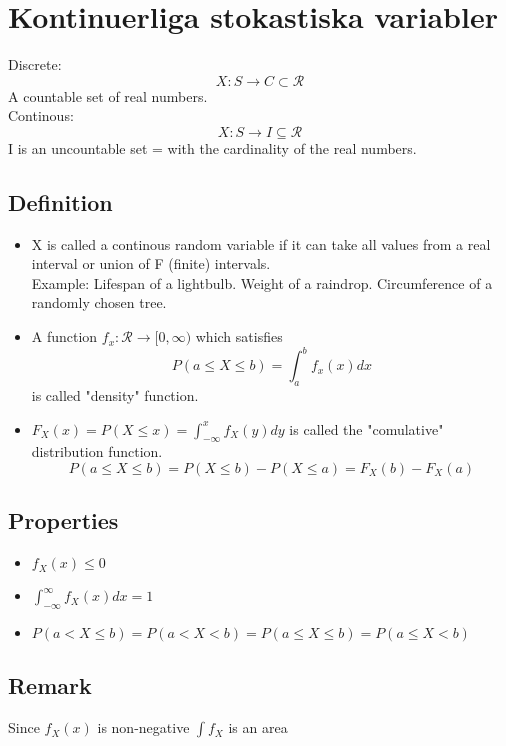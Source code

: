 \documentclass{article}
\newcommand{\RR}{{\mathcal{R}}}
\begin{document}
\section{Kontinuerliga stokastiska variabler}
Discrete:
$$ X:S\rightarrow C\subset \RR $$
A countable set of real numbers.\\
Continous:
$$ X:S\rightarrow I\subseteq \RR $$
I is an uncountable set = with the cardinality of the real numbers.


\subsection{Definition}
\begin{itemize}
    \item X is called a continous random variable if it can take all values from a real interval or union of F (finite) intervals.\\
      Example: Lifespan of a lightbulb. Weight of a raindrop. Circumference of a randomly chosen tree.
    \item A function $f_x:\RR \rightarrow [0,\infty)$ which satisfies
        $$ P(a\le X\le b) = \int^b_a f_x(x)dx $$
        is called "density" function.
      \item $F_X(x) = P(X\le x) = \int^x_{-\infty}f_X(y)dy$
        is called the "comulative" distribution function.
        $$P(a\le X\le b) = P(X\le b) - P(X\le a) = F_X(b)- F_X(a)$$
\end{itemize}

\subsection{Properties}
\begin{itemize}
    \item $ f_X(x) \le 0 $
    \item $ \int^\infty_{-\infty} f_X(x)dx = 1 $
    \item $P(a<X\le b) = P(a<X<b) = P(a\le X\le b) = P(a\le X<b)  $
\end{itemize}

\subsection{Remark}
Since $f_X(x)$ is non-negative $\int f_X$ is an area
\end{document}
